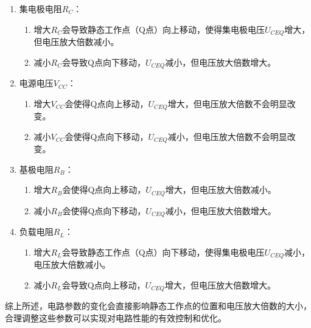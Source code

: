 \documentclass[dvipsnames, svgnames,a4paper,11pt]{article}
\begin{document}
\begin{enumerate}
			\begin{enumerate}
				\item 集电极电阻$R_C$：
					\begin{enumerate}
						\item 增大$R_C$会导致静态工作点（Q点）向上移动，使得集电极电压$U_{CEQ}$增大，但电压放大倍数减小。
						\item 减小$R_C$会导致Q点向下移动，$U_{CEQ}$减小，但电压放大倍数增大。
					\end{enumerate} 
				
				\item 电源电压$V_{CC}$：
					
					\begin{enumerate}
						\item 增大$V_{CC}$会使得Q点向上移动，$U_{CEQ}$增大，但电压放大倍数不会明显改变。
						\item 减小$V_{CC}$会使得Q点向下移动，$U_{CEQ}$减小，但电压放大倍数不会明显改变。
					\end{enumerate}
					
				\item 基极电阻$R_B$：
					
					\begin{enumerate}
						\item 增大$R_B$会使得Q点向上移动，$U_{CEQ}$增大，但电压放大倍数减小。
						\item 减小$R_B$会使得Q点向下移动，$U_{CEQ}$减小，但电压放大倍数增大。
					\end{enumerate}
				
				\item 负载电阻$R_L$：
					
					\begin{enumerate}
						\item 增大$R_L$会导致静态工作点（Q点）向下移动，使得集电极电压$U_{CEQ}$减小，电压放大倍数减小。
						\item 减小$R_L$会导致Q点向上移动，$U_{CEQ}$增大，但电压放大倍数增大。
					\end{enumerate}



			\end{enumerate}

		
		

		
		
		

		

		
		综上所述，电路参数的变化会直接影响静态工作点的位置和电压放大倍数的大小，合理调整这些参数可以实现对电路性能的有效控制和优化。

	\end{enumerate}
	
\end{document}
